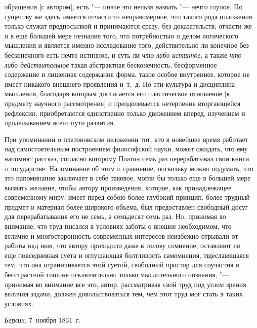 обращения [с автором], есть "--- иначе это нельзя назвать "--- нечто глупое.
По существу же здесь имеется отчасти то неправомерное, что такого рода
положения только служат предпосылкой и принимаются сразу, без
доказательств; отчасти же и в еще большей мере незнание того, что
потребностью и делом логического мышления и является именно исследование
того, действительно ли конечное без бесконечного есть нечто истинное, и
суть ли {\em что-либо истинное}, а также
{\em что-либо действительное} такая абстрактная
бесконечность, бесформенное содержание и лишенная содержания форма, такое
особое внутреннее, которое не имеет никакого внешнего проявления и~т.~д. Но
эти культура и дисциплина мышления, благодаря которым достигается его
пластическое отношение [к предмету научного рассмотрения] и преодолевается
нетерпение вторгающейся рефлексии, приобретаются единственно только
движением вперед, изучением и проделыванием всего пути развития.

При упоминании о платоновском изложении тот, кто в новейшее время работает
над самостоятельным построением философской науки, может ожидать, что ему
напомнят рассказ, согласно которому Платон семь раз перерабатывал свои
книги о государстве. Напоминание об этом и сравнение, поскольку можно
подумать, что это напоминание заключает в себе таковое, могли бы только еще
в большей мере вызвать желание, чтобы автору произведения, которое, как
принадлежащее современному миру, имеет перед собою более глубокий принцип,
более трудный предмет и материал более широкого объема, был предоставлен
свободный досуг для перерабатывания его не семь, а семьдесят семь раз. Но,
принимая во внимание, что труд писался в условиях заботы о внешне
необходимом, что величие и многосторонность современных интересов неизбежно
отрывали от работы над ним, что автору приходило даже в голову сомнение,
оставляют ли еще повседневная суета и оглушающая болтливость самомнения,
тщеславящаяся тем, что она ограничивается этой суетой, свободный простор
для соучастия в бесстрастной тишине исключительно только мыслительного
познания, "--- принимая во внимание все это, автор, рассматривая свой труд
под углом зрения величия задачи, должен довольствоваться тем, чем этот труд
мог стать в таких условиях.

{\em Берлин}, 7~ноября 1831~г.

\bigskip

